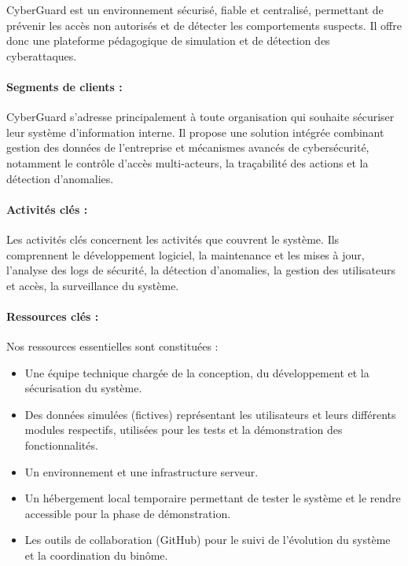 \documentclass[a4paper,12pt]{report}
\begin{document}
   CyberGuard est un environnement sécurisé, fiable et centralisé, permettant de prévenir les accès non autorisés et de détecter les comportements suspects. Il offre donc une plateforme pédagogique de simulation et de détection des cyberattaques.
   
   \paragraph{Segments de clients :}
   
   CyberGuard s'adresse principalement à toute organisation qui souhaite sécuriser leur système d'information interne. Il propose une solution intégrée combinant gestion des données de l'entreprise et mécanismes avancés de cybersécurité, notamment le contrôle d'accès multi-acteurs, la traçabilité des actions et la détection d'anomalies.
   
   \paragraph{Activités clés :}
   
   Les activités clés concernent les activités que couvrent le système. Ils comprennent le développement logiciel, la maintenance et les mises à jour, l'analyse des logs de sécurité, la détection d'anomalies, la gestion des utilisateurs et accès, la surveillance du système.
   
   \paragraph{Ressources clés :}
   
   Nos ressources essentielles sont constituées :
   
   \begin{itemize}
       \item Une équipe technique chargée de la conception, du développement et la sécurisation du système.
       \item Des données simulées (fictives) représentant les utilisateurs et leurs différents modules respectifs, utilisées pour les tests et la démonstration des fonctionnalités.
       \item Un environnement et une infrastructure serveur.
       \item Un hébergement local temporaire permettant de tester le système et le rendre accessible pour la phase de démonstration.
       \item Les outils de collaboration (GitHub) pour le suivi de l'évolution du système et la coordination du binôme.
   \end{itemize}
    
\end{document}
